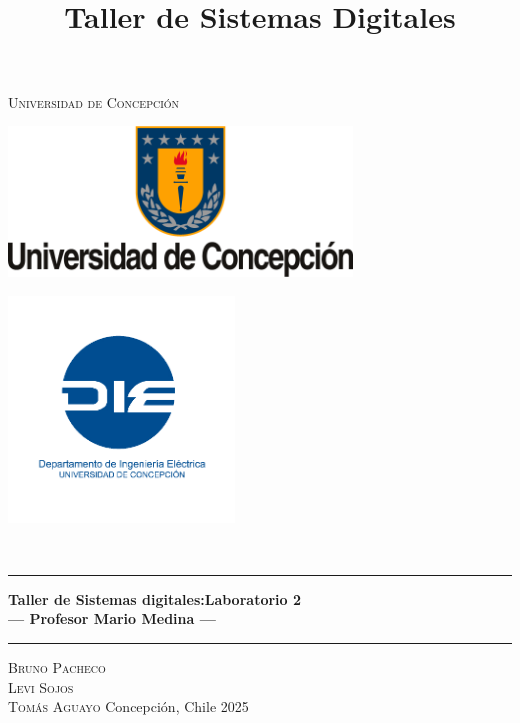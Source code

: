 \title{{\Large \\ Taller de Sistemas Digitales \\[0.1 cm]}}

\pagestyle{fancy}
\fancyhf{}
\lhead{\thetitle}
\cfoot{\thepage}

\begin{titlepage}
    \newcommand{\drop}{0.1\textheight}
    \newcommand{\halfdrop}{0.05\textheight}
    \vspace*{\drop}
    \begin{center}
    {\LARGE\textsc{Universidad de Concepción}}\\[\drop]
    \begin{minipage}{0.47\linewidth}
        \centering
        {\includegraphics[height=4cm]{extras/logo_udec.png}}
    \end{minipage}
    \begin{minipage}{0.47\linewidth}  %
        \centering
        {\includegraphics[height=6cm]{extras/logo_die.png}}
    \end{minipage}\\[\halfdrop]
    \rule{\textwidth}{1pt}\par
    \vspace{0.5\baselineskip}
    {\huge\bfseries Taller de Sistemas digitales:Laboratorio 2\\
    \large --- Profesor Mario Medina ---}\\[0.5\baselineskip]
    \rule{\textwidth}{1pt}\par
    \vfill
    {\Large\textsc{Bruno Pacheco \\ Levi Sojos \\[1ex] Tomás Aguayo}}
    \vfill
    Concepción, Chile
    \vfill
    {\large 2025}
    \end{center}
\end{titlepage}

\fancyfoot[C]{\thepage}  %
\renewcommand{\footrulewidth}{0.4pt}
